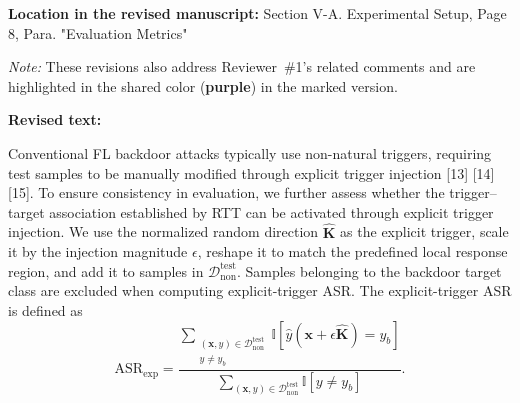 \documentclass[11pt,a4paper]{article}
\newcommand{\manualindent}{\par\noindent\hspace*{1.5em}\ignorespaces}
\newcommand{\revisedtext}[2]{%
  {\bfseries\color{headingnavy}Location in the revised manuscript:} #1\par
  \begin{tcolorbox}[
      enhanced,breakable,colback=replyblue!3,colframe=replyblue!18,
      before upper={\setlength{\parskip}{6pt}},
      borderline west={2.5pt}{0pt}{replyblue},
      boxrule=0.5pt,arc=1mm,left=11pt,right=9pt,top=8pt,bottom=8pt]
    {\bfseries\color{headingnavy}Revised text:}\par
    #2
  \end{tcolorbox}
  \vspace{0.35em}%
}
\begin{document}
\revisedtext{Section V-A. Experimental Setup, Page 8, Para. "Evaluation Metrics"\par \noindent \textit{Note:} These revisions also address Reviewer~\#1's related comments and are highlighted in the shared color (\textcolor{share}{\textbf{purple}}) in the marked version.}{\manualindent Conventional FL backdoor attacks typically use non-natural triggers, requiring test samples to be manually modified through explicit trigger injection [13] [14] [15].
To ensure consistency in evaluation, we further assess whether the trigger--target association established by RTT can be activated through explicit trigger injection.
We use the normalized random direction $\hat{\mathbf{K}}$ as the explicit trigger, scale it by the injection magnitude $\epsilon$, reshape it to match the predefined local response region, and add it to samples in $\mathcal{D}_{\mathrm{non}}^{\mathrm{test}}$.
Samples belonging to the backdoor target class are excluded when computing explicit-trigger ASR. The explicit-trigger ASR is defined as
\begin{equation}
\mathrm{ASR}_{\mathrm{exp}}
=
\frac{
\sum_{\substack{
(\mathbf{x},y)\in\mathcal{D}_{\mathrm{non}}^{\mathrm{test}}\\
y\neq y_b
}}
\mathbb{I}[
\hat{y}(\mathbf{x}+\epsilon\hat{\mathbf{K}})=y_b
]
}{
\sum_{(\mathbf{x},y)\in\mathcal{D}_{\mathrm{non}}^{\mathrm{test}}}
\mathbb{I}[y\neq y_b]
}.
\end{equation}}
\end{document}
